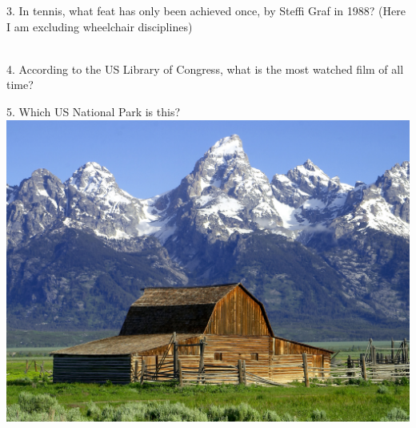 \begin{frame}
\begin{center}
\Large
3. In tennis, what feat has only been achieved once, by Steffi Graf in 1988? (Here I am excluding wheelchair disciplines)
\\
\\
\end{center}
\end{frame}
\begin{frame}
\begin{center}
\Large
4. According to the US Library of Congress, what is the most watched film of all time?
\\
\end{center}
\end{frame}
\begin{frame}
\begin{center}
\Large
5. Which US National Park is this?
\\
\vspace{0.5em}\includegraphics[height=0.6\paperheight]{images/grand_tetons.jpg}
\\
\end{center}
\end{frame}
